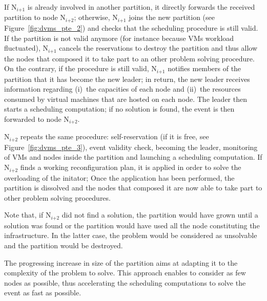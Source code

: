 If N\(_{\textit{i+1}}\) is already involved in another partition, it directly
forwards the received partition to node N\(_{\textit{i+2}}\); otherwise,
N\(_{\textit{i+1}}\) joins the new partition (see Figure~\ref{fig:dvms_pte_2})
and checks that the scheduling procedure is still valid.  If the partition is
not valid anymore (for instance because VMs workload fluctuated),
N\(_{\textit{i+1}}\) cancels the reservations to destroy
the partition and thus allow the nodes that composed it to take part to an other
problem solving procedure.
%
On the contrary, if the procedure is still valid, N\(_{\textit{i+1}}\) notifies
members of the partition that it has become the new leader; in return, the new
leader receives information regarding (i)~the capacities of each node and
(ii)~the resources consumed by virtual machines that are hosted on each node.
The leader then starts a scheduling computation; if no solution is found, the
event is then forwarded to node N\(_{\textit{i+2}}\).

N\(_{\textit{i+2}}\) repeats the same procedure: self-reservation
(if it is free, see Figure~\ref{fig:dvms_pte_3}), event validity check, becoming
the leader, monitoring of VMs and nodes inside the partition and launching a
scheduling computation.  If N\(_{\textit{i+2}}\) finds a working reconfiguration
plan, it is applied in order to solve the overloading of the initator; Once the
application has been performed, the partition is dissolved and the nodes that
composed it are now able to take part to other problem solving procedures.

Note that, if N\(_{\textit{i+2}}\) did not find a solution, the partition would
have grown until a solution was found or the partition would have used all the
node constituting the infrastructure. In the latter case, the problem would be
considered as unsolvable and the partition would be destroyed.

The progressing increase in size of the partition aims at adapting it to the
complexity of the problem to solve.
This approach enables to consider as few nodes as possible, thus accelerating
the scheduling computations to solve the event as fast as possible.


